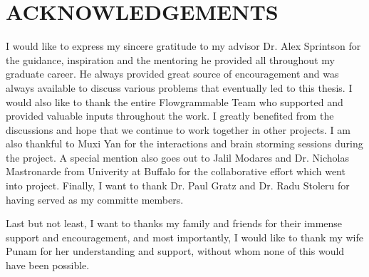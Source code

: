 %
%
%


\chapter*{ACKNOWLEDGEMENTS}
\label{sec:acknowledgements}



\indent I would like to express my sincere gratitude to my advisor Dr. Alex Sprintson for the guidance, inspiration and the mentoring he provided all throughout my graduate career. He always provided great source of encouragement and was always available to discuss various problems that eventually led to this thesis. I would also like to thank the entire Flowgrammable Team who supported and provided valuable inputs throughout the work. I greatly benefited from the discussions and hope that we continue to work together in other projects. I am also thankful to Muxi Yan for the interactions and brain storming sessions during the \aetherflow project. A special mention also goes out to Jalil Modares and Dr. Nicholas Mastronarde from Univerity at Buffalo for the collaborative effort which went into \crossflow project. Finally, I want to thank Dr. Paul Gratz and Dr. Radu Stoleru for having served as my committe members.

\indent Last but not least, I want to thanks my family and friends for their immense support and encouragement, and most importantly, I would like to thank my wife Punam for her understanding and support, without whom none of this would have been possible.


\pagebreak{}
